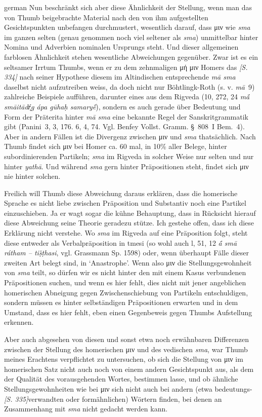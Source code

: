 \begin{otherlanguage*}{german}
Nun beschränkt sich aber diese Ähnlichkeit der Stellung, wenn man das von Thumb beigebrachte Material nach den von ihm aufgestellten Gesichtspunkten unbefangen durchmustert, wesentlich darauf, dass μιν wie \emph{sma} im ganzen selten (genau genommen noch viel seltener als \emph{sma}) unmittelbar hinter Nomina und Adverbien nominalen Ursprungs steht. Und dieser allgemeinen farblosen Ähnlichkeit stehen wesentliche Abweichungen gegenüber. Zwar ist es ein seltsamer Irrtum Thumbs, wenn er zu dem zehnmaligen μή μιν Homers das \hypertarget{p334}{\emph{[S. 334]}}\label{p334} nach seiner Hypothese diesem im Altindischen entsprechende \emph{mā sma} daselbst nicht aufzutreiben weiss, da doch nicht nur Böhtlingk-Roth (s. v. \emph{mā}~9) zahlreiche Beispiele aufführen, darunter eines aus dem Rigveda (10, 272, 24 \emph{mā́ smāitādŕ̥g ápa gūhaḥ samaryḗ}), sondern es auch gerade über Bedeutung und Form der Präterita hinter \emph{mā sma} eine bekannte Regel der Sanskritgrammatik gibt (Panini~3, 3, 176. 6, 4, 74. Vgl. Benfey Vollst. Gramm. §~808~I Bem.~4). Aber in andern Fällen ist die Divergenz zwischen μιν und \emph{sma} thatsächlich. Nach
Thumb findet sich μιν bei Homer ca. 60 mal, in 10\% aller Belege, hinter subordinierenden Partikeln; \emph{sma} im Rigveda in solcher Weise nur selten und nur hinter \emph{yathā}. Und während \emph{sma} gern hinter Präpositionen steht, findet sich μιν nie hinter solchen.

Freilich will Thumb diese Abweichung daraus erklären,
dass die homerische Sprache es nicht liebe zwischen Präposition und Substantiv noch eine Partikel einzuschieben. Ja er wagt sogar die kühne Behauptung, dass in Rücksicht hierauf diese Abweichung seine Theorie geradezu stütze. Ich gestehe offen, dass ich diese Erklärung nicht verstehe. Wo \emph{sma} im Rigveda auf eine Präposition folgt, steht diese entweder als Verbalpräposition in tmesi (so wohl auch l, 51, 12 \emph{ā́ smā rátham -- tiṣ̌ṭhasi}, vgl. Grassmann Sp. 1598) oder, wenn überhaupt Fälle dieser zweiten Art belegt sind, in `Anastrophe'. Wenn also μιν die Stellungsgewohnheit von \emph{sma} teilt, so dürfen wir es nicht hinter den mit einem Kasus verbundenen Präpositionen suchen, und wenn es hier fehlt, dies nicht mit jener angeblichen homerischen Abneigung gegen Zwischenschiebung von Partikeln entschuldigen, sondern müssen es hinter selbständigen Präpositionen erwarten und in dem Umstand, dass es hier fehlt, eben einen Gegenbeweis gegen Thumbs Aufstellung erkennen.

Aber auch abgesehen von diesen und sonst etwa noch erwähnbaren Differenzen zwischen der Stellung des homerischen μιν und des vedischen \emph{sma}, war Thumb meines Erachtens verpflichtet zu untersuchen, ob sich die Stellung von μιν im homerischen Satz nicht auch noch von einem andern Gesichtspunkt aus, als dem der Qualität des vorausgehenden Wortes, bestimmen lasse, und ob ähnliche Stellungsgewohnheiten wie bei μιν sich nicht auch bei andern (etwa be\-deutungs-\hypertarget{p335}{\emph{[S. 335]}}\label{p335}verwandten oder formähnlichen) Wörtern finden, bei denen an Zusammenhang mit \emph{sma} nicht gedacht werden kann.


\end{otherlanguage*}
